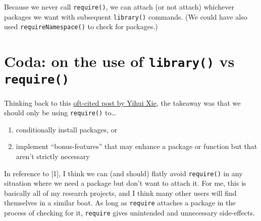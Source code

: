\documentclass[]{article}
\newenvironment{Shaded}{\begin{snugshade}}{\end{snugshade}}
\newcommand{\CommentTok}[1]{\textcolor[rgb]{0.56,0.35,0.01}{\textit{#1}}}
\newcommand{\DataTypeTok}[1]{\textcolor[rgb]{0.13,0.29,0.53}{#1}}
\newcommand{\KeywordTok}[1]{\textcolor[rgb]{0.13,0.29,0.53}{\textbf{#1}}}
\newcommand{\NormalTok}[1]{#1}
\newcommand{\OperatorTok}[1]{\textcolor[rgb]{0.81,0.36,0.00}{\textbf{#1}}}
\newcommand{\OtherTok}[1]{\textcolor[rgb]{0.56,0.35,0.01}{#1}}
\newcommand{\StringTok}[1]{\textcolor[rgb]{0.31,0.60,0.02}{#1}}
\providecommand{\tightlist}{%
  \setlength{\itemsep}{0pt}\setlength{\parskip}{0pt}}
\theoremstyle{definition}
\theoremstyle{definition}
\theoremstyle{definition}
\theoremstyle{remark}
\begin{document}
\begin{Shaded}
\end{Shaded}

Because we never call \texttt{require()}, we can attach (or not attach)
whichever packages we want with subsequent \texttt{library()} commands.
(We could have also used \texttt{requireNamespace()} to check for
packages.)

\hypertarget{coda-on-the-use-of-library-vs-require}{%
\section{\texorpdfstring{Coda: on the use of \texttt{library()} vs
\texttt{require()}}{Coda: on the use of library() vs require()}}\label{coda-on-the-use-of-library-vs-require}}

Thinking back to this
\href{https://yihui.name/en/2014/07/library-vs-require/}{oft-cited post
by Yihui Xie}, the takeaway was that we should only be using
\texttt{require()} to\ldots{}

\begin{enumerate}
\def\labelenumi{\arabic{enumi}.}
\tightlist
\item
  conditionally install packages, or
\item
  implement ``bonus-features'' that may enhance a package or function
  but that aren't strictly necessary
\end{enumerate}

In reference to {[}1{]}, I think we can (and should) flatly avoid
\texttt{require()} in any situation where we need a package but don't
want to attach it. For me, this is basically all of my research
projects, and I think many other users will find themselves in a similar
boat. As long as \texttt{require} attaches a package in the process of
checking for it, \texttt{require} gives unintended and unnecessary
side-effects.
\end{document}
